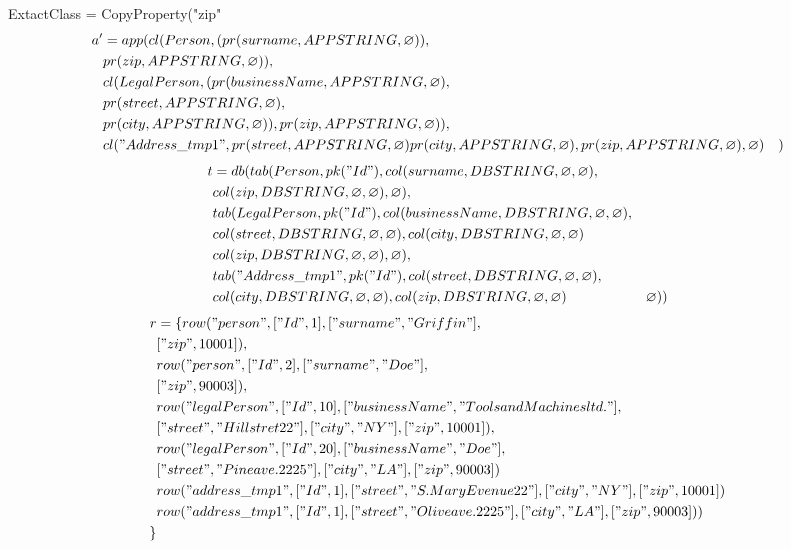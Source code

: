 \documentclass[11pt]{article}
\begin{document}
\newpage
ExtactClass = CopyProperty("zip"
\begin{align*}
a' &= app(cl(Person, (pr(surname, APPSTRING, \varnothing)), \\
& pr(zip, APPSTRING, \varnothing)), \\
& cl(LegalPerson, (pr(businessName, APPSTRING, \varnothing), \\
& pr(street, APPSTRING, \varnothing), \\
& pr(city, APPSTRING, \varnothing)), pr(zip, APPSTRING, \varnothing)), \\
& cl("Address\_tmp1", pr(street, APPSTRING, \varnothing) pr(city, APPSTRING, \varnothing), pr(zip, APPSTRING, \varnothing), \varnothing)
& )
\end{align*}
\begin{align*}
t &= db(tab(Person, pk("Id"), col(surname, DBSTRING, \varnothing, \varnothing), \\
& col(zip, DBSTRING, \varnothing, \varnothing), \varnothing), \\
& tab(LegalPerson, pk("Id"),  col(businessName, DBSTRING, \varnothing, \varnothing), \\
& col(street, DBSTRING, \varnothing, \varnothing), col(city, DBSTRING, \varnothing, \varnothing) \\
& col(zip, DBSTRING, \varnothing, \varnothing), \varnothing), \\
& tab("Address\_tmp1", pk("Id"), col(street, DBSTRING, \varnothing, \varnothing),\\
& col(city, DBSTRING, \varnothing, \varnothing), col(zip, DBSTRING, \varnothing, \varnothing)
& \varnothing)) 
\end{align*}
\begin{align*}
r &= \{ row("person", ["Id", 1], ["surname", "Griffin"], \\
& ["zip", 10001]), \\
& row("person", ["Id", 2], ["surname", "Doe"], \\
& ["zip", 90003]), \\
& row("legalPerson", ["Id", 10], ["businessName", "Tools and Machines ltd."], \\
& ["street", "Hill stret 22"], ["city", "NY"], ["zip", 10001]), \\
& row("legalPerson", ["Id", 20], ["businessName", "Doe"], \\
& ["street", "Pine ave. 2225"], ["city", "LA"], ["zip", 90003])\\
& row("address\_tmp1", ["Id", 1], ["street", "S. Mary Evenue 22"], ["city", "NY"], ["zip", 10001]) \\
& row("address\_tmp1", ["Id", 1], ["street", "Olive ave. 2225"], ["city", "LA"], ["zip", 90003]) )\\
\}
\end{align*}
\end{document}
